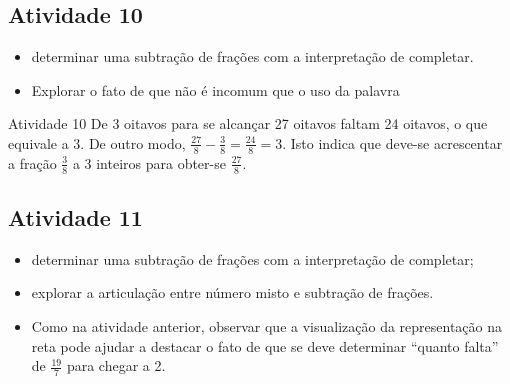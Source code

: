 \begin{multicols}{2}

\subsection{Atividade 10}

\newline \vspace{.15cm}

\begin{itemize} %
  \item     determinar uma subtração de frações com a interpretação de completar.
\end{itemize} %


 \vspace{.15cm}

\begin{itemize} %
  \item     Explorar o fato de que não é incomum que o uso da palavra
\end{itemize} %

\begin{resposta*}{Atividade 10}
De 3 oitavos para se alcançar 27 oitavos faltam 24 oitavos, o que equivale a 3. De outro modo, $\frac{27}{8} - \frac{3}{8} = \frac{24}{8} = 3$. Isto indica que deve-se acrescentar a fração $\frac{3}{8}$ a 3 inteiros para obter-se $\frac{27}{8}$.
\end{resposta*}

\subsection{Atividade 11}

  \newline \vspace{.15cm}
\begin{itemize} %
    \item       determinar uma subtração de frações com a interpretação de completar;
    \item       explorar a articulação entre número misto e subtração de frações.
\end{itemize} %

 \vspace{.15cm}
\begin{itemize} %
    \item       Como na atividade anterior, observar que a visualização da representação na reta pode ajudar a destacar o fato de que se deve determinar       ``quanto falta''       de       $\frac{19}{7}$       para chegar a 2.
\end{itemize} %


\end{multicols}
